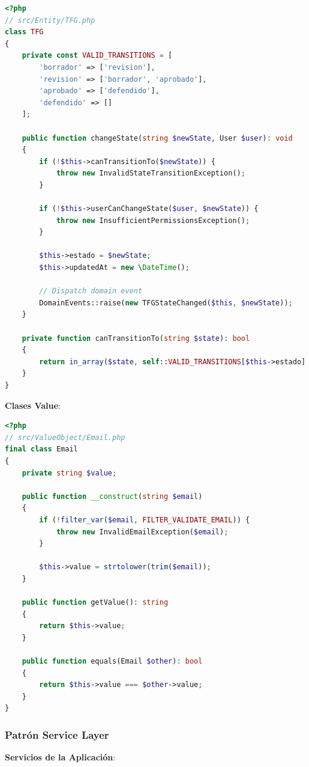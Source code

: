 \documentclass[12pt,a4paper,oneside]{report}
\begin{document}
\begin{lstlisting}[language=PHP]
<?php
// src/Entity/TFG.php
class TFG
{
    private const VALID_TRANSITIONS = [
        'borrador' => ['revision'],
        'revision' => ['borrador', 'aprobado'],
        'aprobado' => ['defendido'],
        'defendido' => []
    ];
    
    public function changeState(string $newState, User $user): void
    {
        if (!$this->canTransitionTo($newState)) {
            throw new InvalidStateTransitionException();
        }
        
        if (!$this->userCanChangeState($user, $newState)) {
            throw new InsufficientPermissionsException();
        }
        
        $this->estado = $newState;
        $this->updatedAt = new \DateTime();
        
        // Dispatch domain event
        DomainEvents::raise(new TFGStateChanged($this, $newState));
    }
    
    private function canTransitionTo(string $state): bool
    {
        return in_array($state, self::VALID_TRANSITIONS[$this->estado] ?? []);
    }
}
\end{lstlisting}

\textbf{Clases Value}:

\begin{lstlisting}[language=PHP]
<?php
// src/ValueObject/Email.php
final class Email
{
    private string $value;
    
    public function __construct(string $email)
    {
        if (!filter_var($email, FILTER_VALIDATE_EMAIL)) {
            throw new InvalidEmailException($email);
        }
        
        $this->value = strtolower(trim($email));
    }
    
    public function getValue(): string
    {
        return $this->value;
    }
    
    public function equals(Email $other): bool
    {
        return $this->value === $other->value;
    }
}
\end{lstlisting}

\subsubsection{Patrón Service Layer}\label{patruxf3n-service-layer}

\textbf{Servicios de la Aplicación}:
\end{document}
